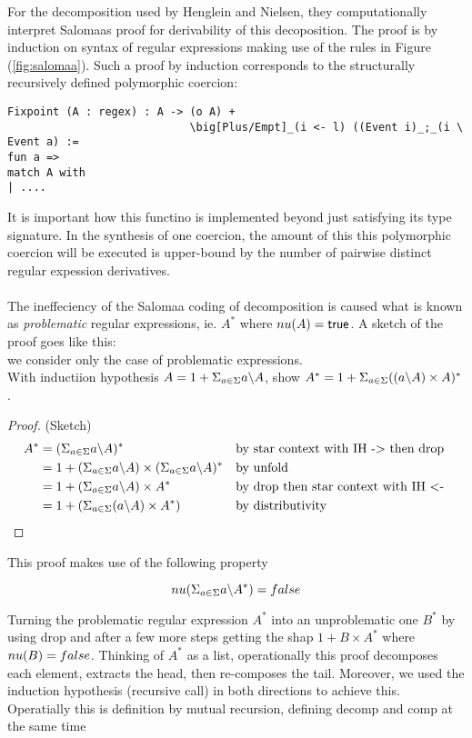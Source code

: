 \documentclass[a4paper,UKenglish,cleveref, autoref, thm-restate]{lipics-v2021}
\begin{document}
For the decomposition used by Henglein and Nielsen, they computationally interpret Salomaas proof for derivability of this decoposition. The proof is by induction on syntax of regular expressions making use of the rules in Figure (\ref{fig:salomaa}). Such a proof by induction corresponds to the structurally recursively defined polymorphic coercion:
\begin{verbatim}
Fixpoint (A : regex) : A -> (o A) +  
                            \big[Plus/Empt]_(i <- l) ((Event i)_;_(i \ Event a) :=
fun a => 
match A with 
| ....
\end{verbatim}
It is important how this functino is implemented beyond just satisfying its type signature. In the synthesis of one coercion, the amount of this this polymorphic coercion will be executed is upper-bound by the number of pairwise distinct regular expession derivatives.\\\\
The ineffeciency of the Salomaa coding of decomposition is caused what is known as \textit{problematic} regular expressions, ie. $A^ *$ where $\mynu{A} = \textsf{true}$. A sketch of the proof goes like this:\\
we consider only the case of problematic expressions.\\
With inductiion hypothesis $A = 1 + \Sigma_{a \in \Sigma} a \backslash A$, show $A^* = 1  + \Sigma_{a \in \Sigma} ((a \backslash A)\times A)^*$.
\begin{proof} (Sketch)
\begin{align}
A^* &= ( \Sigma_{a \in \Sigma} a \backslash A)^* &&\text{by star context with IH -> then drop}\\
 &= 1 + (\Sigma_{a \in \Sigma} a \backslash A) \times (\Sigma_{a \in \Sigma} a \backslash A)^* &&\text{by unfold}\\
 &= 1 + (\Sigma_{a \in \Sigma} a \backslash A) \times A^* && \text{by drop then star context with IH <- } \\
 &= 1 + (\Sigma_{a \in \Sigma} (a \backslash A) \times A^*) && \text{by distributivity }
\end{align}
\end{proof}
This proof makes use of the following property
\begin{lemma}
\[\mynu{\decomp{A}} = \false\]
\end{lemma}
Turning the problematic regular expression $A^*$ into an unproblematic one $B^*$ by using drop and after a few more steps getting the shap $1 + B \times A^*$ where $\mynu{B} = \false$. Thinking of $A^*$ as a list, operationally this proof decomposes each element, extracts the head, then re-composes the tail. Moreover, we used the induction hypothesis (recursive call) in both directions to achieve this. Operatially this is definition by mutual recursion, defining \textsf{decomp} and \textsf{comp} at the same time  
\end{document}
